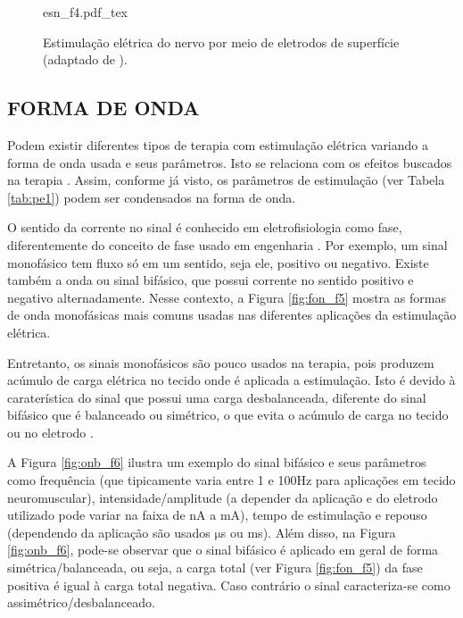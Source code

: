 \begin{figure*}[h]
    \centering %
    \small %
    \def\svgwidth{0.9\columnwidth}%
    {esn_f4.pdf_tex}
    \caption{Estimulação elétrica do nervo por meio de eletrodos de superfície (adaptado de  \cite{Robinson2002}).}
    \label{fig:esn_f4}
\end{figure*}

\subsection{FORMA DE ONDA}
Podem existir diferentes tipos de terapia com estimulação elétrica variando a forma de onda usada e seus parâmetros. Isto se relaciona com os efeitos buscados na terapia \cite{Paulo2007}. Assim, conforme já visto, os parâmetros de estimulação (ver Tabela \ref{tab:pe1}) podem ser condensados na forma de onda.

O sentido da corrente no sinal é conhecido em eletrofisiologia como fase, diferentemente do conceito de fase usado em engenharia \cite{Robinson2002}. Por exemplo, um sinal monofásico tem fluxo só em um sentido, seja ele, positivo ou negativo. Existe também a onda ou sinal bifásico, que possui corrente no sentido positivo e negativo alternadamente. Nesse contexto, a Figura \ref{fig:fon_f5} mostra as formas de onda monofásicas mais comuns usadas nas diferentes aplicações da estimulação elétrica. 

Entretanto, os sinais monofásicos são pouco usados na terapia, pois produzem acúmulo de carga elétrica no tecido onde é aplicada a estimulação. Isto é devido à caraterística do sinal que possui uma carga desbalanceada, diferente do sinal bifásico que é balanceado ou simétrico, o que evita o acúmulo de carga no tecido ou no eletrodo \cite{Wu2002}.

A Figura \ref{fig:onb_f6} ilustra um exemplo do sinal bifásico e seus parâmetros como frequência (que tipicamente varia entre 1 e 100Hz para aplicações em tecido neuromuscular), intensidade/amplitude (a depender da aplicação e do eletrodo utilizado pode variar na faixa de nA a mA), tempo de estimulação e repouso (dependendo da aplicação são usados $\mathrm{\mu}$s ou ms). Além disso, na Figura \ref{fig:onb_f6}, pode-se observar que o sinal bifásico é aplicado em geral de forma simétrica/balanceada, ou seja, a carga total (ver Figura \ref{fig:fon_f5}) da fase positiva é igual à carga total negativa. Caso contrário o sinal caracteriza-se como assimétrico/desbalanceado.

